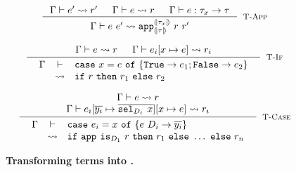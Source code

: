 \begin{figure}
$$
\inference{
	\tologicshort{\env}{e'}{\typ_x}{\pred'}{\embed{\typ_x}}{\smtenv}{\axioms'}
	&
	\tologicshort{\env}{e}{\tfun{x}{\typ_x}{\typ}}{\pred}{\tsmtfun{\embed{\typ_x}}{\embed{\typ}}}{\smtenv}{\axioms}
	& 
	\hastype{\env}{e}{{\typ_x}\rightarrow{\typ}}
}{
	\tologicshort{\env}{e\ e'}{\typ}{\smtappname{\embed{\typ_x}}{\embed{\typ}}\ {\pred}\ {\pred'}}{\embed{\typ}}{\smtenv}{\andaxioms{\axioms}{\axioms'}}
}[\lgapp]
$$


$$
\inference{
	\tologicshort{\env}{e}{\tbool}{\pred}{\tbool}{\smtenv}{\axioms} & 
	\tologicshort{\env}{e_i\subst{x}{e}}{\typ}{\pred_i}{\embed{\typ}}{\smtenv}{\axioms_i}
}{
	\tologicshorttwolines{\env}{\ecaseexp{x}{e}{\etrue \rightarrow e_1; \efalse \rightarrow e_2}}{\typ}
	 {\eif{\pred}{\pred_1}{\pred_2}}{\embed{\typ}}{\smtenv}{\andaxioms{\axioms}{\axioms_i}}
}[\lgcaseBool]
$$

$$
\inference{
	\tologicshort{\env}{e}{\typ_e}{\pred}{\embed{\typ_e}}{\smtenv}{\axioms}\\
	\tologicshort{\env}{e_i\subst{\overline{y_i}}{\overline{\selector{\dc_i}{}\ x}}\subst{x}{e}}{\typ}{\pred_i}{\embed{\typ}}{\smtenv}{\axioms_i}
}{
	\tologicshorttwolines{\env}{\ecase{x}{e}{\dc_i}{\overline{y_i}}{e_i}}{\typ}
	 {\eif{\smtappname{}{}\ \checkdc{\dc_1}\ \pred}{\pred_1}{\ldots} \ \mathtt{else}\ \pred_n}{\embed{\typ}}{\smtenv}
	 {\andaxioms{\axioms}{\axioms_i}}
}[\lgcase]
$$
\caption{\textbf{Transforming \corelan terms into \smtlan.}}
\label{fig:defunc}
\end{figure}
